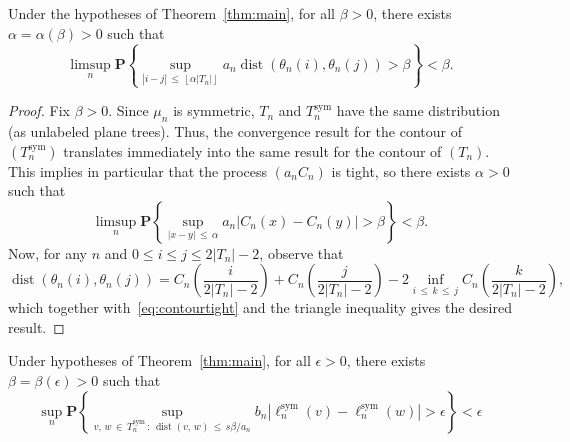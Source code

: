 \documentclass[AHL,Unicode,longabstracts,published]{cedram}
\DeclareMathOperator{\sym}{sym}
\DeclareMathOperator{\dist}{dist}
\newcommand{\p}[1]{\mathbf{P}\left\{#1\right\}}
\begin{document}
\begin{lemm}\label{lem:contourTight}
Under the hypotheses of Theorem~\ref{thm:main}, for all $\beta>0$, there exists $\alpha = \alpha(\beta)>0$ such that
\[
\limsup_n\p{\sup_{|i-j|\,\le\,\left\lfloor \alpha |T_n| \right\rfloor} a_n \dist\left(\theta_{n}(i),\theta_{n}(j)\right)> \beta}<\beta.
\]
\end{lemm}


\begin{proof}
Fix $\beta>0$. Since $\mu_n$ is symmetric, $T_n$ and $T^{\sym}_n$ have the same distribution (as unlabeled plane trees). Thus, the convergence result for the contour of $(T^{\sym}_n)$ translates immediately into the same result for the contour of $(T_n)$. This implies in particular that the process $(a_nC_n)$ is tight, so there exists $\alpha>0$ such that
\begin{equation}\label{eq:contourtight}
\limsup_n\p{\sup_{|x-y|\,\le\,\alpha} a_n \left|C_n(x)-C_n(y)\right|> \beta}<\beta.
\end{equation}
Now, for any $n$ and $0\le i\le j \le 2|T_n|-2$, observe that
\[
\dist\left(\theta_n(i),\theta_n(j)\right) = C_n\left(\frac{i}{2|T_n|-2}\right)+C_n\left(\frac{j}{2|T_n|-2}\right)-2 \inf_{i\,\le\,k\,\le\,j}C_n\left(\frac{k}{2|T_n|-2}\right),
\]
which together with~\eqref{eq:contourtight} and the triangle inequality gives the desired result.
\end{proof}


\begin{lemm}\label{lem:labelTight}
Under hypotheses of Theorem~\ref{thm:main}, for all $\epsilon>0$, there exists $\beta=\beta(\epsilon)>0$ such that
\[
\sup_n\p{\sup_{v,\,w\,\in\,T_n^{\sym}\,:\,\dist(v,\,w)\,\le\,s \beta/a_n} b_n \left|\ell^{\sym}_n(v) -\ell^{\sym}_n(w)\right|>\epsilon}<\epsilon
\]
\end{lemm}
\end{document}
